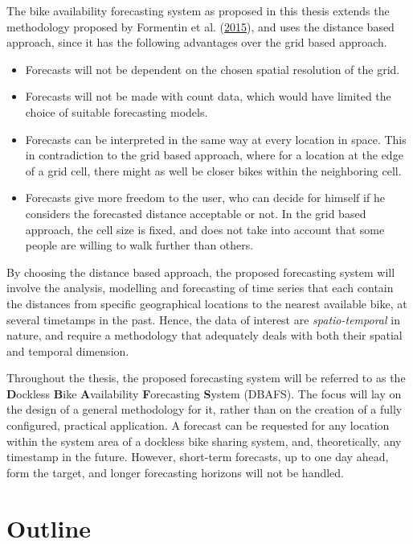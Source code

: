 \documentclass[12pt,oneside]{reedthesis}
\providecommand{\tightlist}{%
  \setlength{\itemsep}{0pt}\setlength{\parskip}{0pt}}
\begin{document}
The bike availability forecasting system as proposed in this thesis
extends the methodology proposed by Formentin et al.
(\protect\hyperlink{ref-formentin2015}{2015}), and uses the distance
based approach, since it has the following advantages over the grid
based approach.
\begin{itemize}
\tightlist
\item
  Forecasts will not be dependent on the chosen spatial resolution of
  the grid.
\item
  Forecasts will not be made with count data, which would have limited
  the choice of suitable forecasting models.
\item
  Forecasts can be interpreted in the same way at every location in
  space. This in contradiction to the grid based approach, where for a
  location at the edge of a grid cell, there might as well be closer
  bikes within the neighboring cell.
\item
  Forecasts give more freedom to the user, who can decide for himself if
  he considers the forecasted distance acceptable or not. In the grid
  based approach, the cell size is fixed, and does not take into account
  that some people are willing to walk further than others.
\end{itemize}
By choosing the distance based approach, the proposed forecasting system
will involve the analysis, modelling and forecasting of time series that
each contain the distances from specific geographical locations to the
nearest available bike, at several timetamps in the past. Hence, the
data of interest are \emph{spatio-temporal} in nature, and require a
methodology that adequately deals with both their spatial and temporal
dimension.

Throughout the thesis, the proposed forecasting system will be referred
to as the \textbf{D}ockless \textbf{B}ike \textbf{A}vailability
\textbf{F}orecasting \textbf{S}ystem (DBAFS). The focus will lay on the
design of a general methodology for it, rather than on the creation of a
fully configured, practical application. A forecast can be requested for
any location within the system area of a dockless bike sharing system,
and, theoretically, any timestamp in the future. However, short-term
forecasts, up to one day ahead, form the target, and longer forecasting
horizons will not be handled.

\section{Outline}\label{outline}
\end{document}
